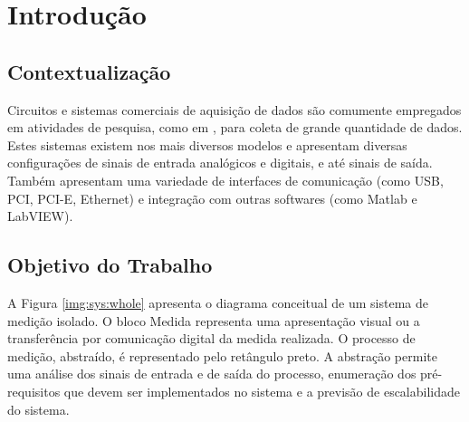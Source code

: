 \chapter{Introdução}\label{cap:intro}

	\section{Contextualização}\label{sec:intro:intro}
		Circuitos e sistemas comerciais de aquisição de dados são comumente empregados em atividades de pesquisa, como em \cite{spoonkillervideo}, para coleta de grande quantidade de dados. Estes sistemas existem nos mais diversos modelos e apresentam diversas configurações de sinais de entrada analógicos e digitais, e até sinais de saída. Também apresentam uma variedade de interfaces de comunicação (como USB, PCI, PCI-E, Ethernet) e integração com outras softwares (como Matlab\textsuperscript{\textregistered} e LabVIEW\textsuperscript{\textregistered}).



	\section{Objetivo do Trabalho}\label{sec:intro:objetivo}

		A Figura \ref{img:sys:whole} apresenta o diagrama conceitual de um sistema de medição isolado. O bloco Medida representa uma apresentação visual ou a transferência por comunicação digital da medida realizada. O processo de medição, abstraído, é representado pelo retângulo preto. A abstração permite uma análise dos sinais de entrada e de saída do processo, enumeração dos pré-requisitos que devem ser implementados no sistema e a previsão de escalabilidade do sistema.

